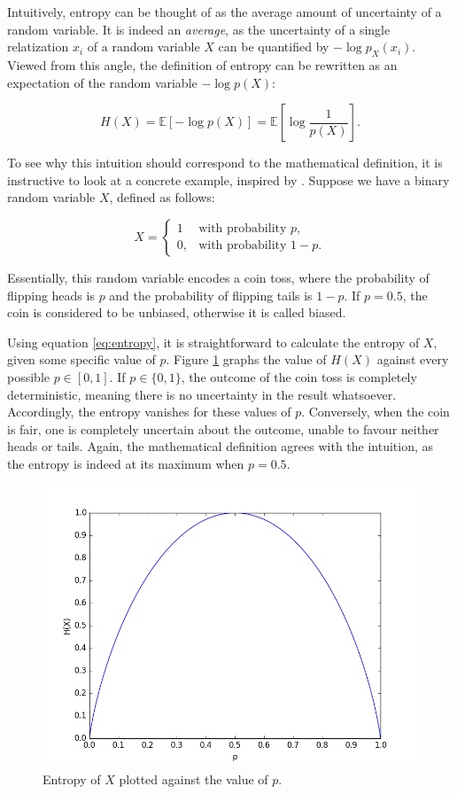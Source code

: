 \documentclass[12pt]{article}
\begin{document}
Intuitively, entropy can be thought of as the average amount of uncertainty of a random variable. It is indeed an \textit{average}, as the uncertainty of a single relatization $x_i$ of a random variable $X$ can be quantified by $-\log p_X(x_i)$. Viewed from this angle, the definition of entropy can be rewritten as an expectation of the random variable $-\log p(X)$: 

$$H(X) = \mathbb{E} \left[ - \log p(X) \right] = \mathbb{E} \left[ \log \frac{1}{p(X)} \right].$$

To see why this intuition should correspond to the mathematical definition, it is instructive to look at a concrete example, inspired by \cite{cover-thomas}. Suppose we have a binary random variable $X$, defined as follows: 

$$X = \begin{cases} 1 & \mbox{with probability } p, \\ 0, & \mbox{with probability } 1-p. \end{cases}$$

Essentially, this random variable encodes a coin toss, where the probability of flipping heads is $p$ and the probability of flipping tails is $1-p$. If $p=0.5$, the coin is considered to be unbiased, otherwise it is called biased.

Using equation \ref{eq:entropy}, it is straightforward to calculate the entropy of $X$, given some specific value of $p$. Figure \ref{fig:entropy} graphs the value of $H(X)$ against every possible $p \in \left[ 0, 1 \right]$. If $p \in \{0, 1\}$, the outcome of the coin toss is completely deterministic, meaning there is no uncertainty in the result whatsoever. Accordingly, the entropy vanishes for these values of $p$. Conversely, when the coin is fair, one is completely uncertain about the outcome, unable to favour neither heads or tails. Again, the mathematical definition agrees with the intuition, as the entropy is indeed at its maximum when $p = 0.5$.

\begin{figure} [h]
\begin{center}
\includegraphics[width=.9\textwidth]{entropy}
\caption{Entropy of $X$ plotted against the value of $p$.}
\label{fig:entropy}
\end{center}
\end{figure}
\end{document}
